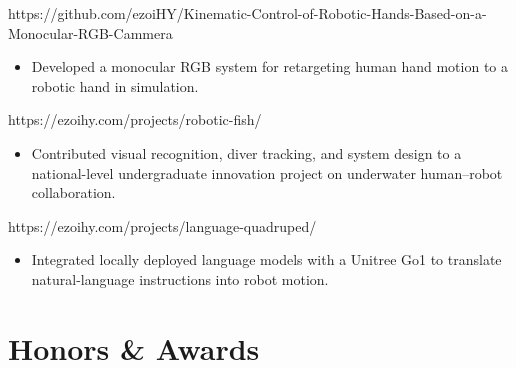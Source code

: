 \documentclass[a4paper,11pt]{article}
\begin{document}
{https://github.com/ezoiHY/Kinematic-Control-of-Robotic-Hands-Based-on-a-Monocular-RGB-Cammera}
\begin{itemize}
  \item Developed a monocular RGB system for retargeting human hand motion to a robotic hand in simulation.
\end{itemize}

{https://ezoihy.com/projects/robotic-fish/}
\begin{itemize}
  \item Contributed visual recognition, diver tracking, and system design to a national-level undergraduate innovation project on underwater human--robot collaboration.
\end{itemize}

{https://ezoihy.com/projects/language-quadruped/}
\begin{itemize}
  \item Integrated locally deployed language models with a Unitree Go1 to translate natural-language instructions into robot motion.
\end{itemize}

\section*{Honors \& Awards}
\begin{itemize}[itemsep=3pt]
\end{itemize}
\end{document}
